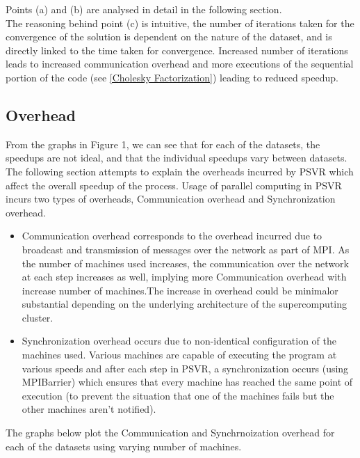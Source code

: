 \documentclass[12pt]{article}
\begin{document}
Points (a) and (b) are analysed in detail in the following section.\\
The reasoning behind point (c) is intuitive, the number of iterations taken for the convergence of the solution is dependent on the nature of the  dataset, and is directly linked to the time taken for convergence. Increased number of iterations leads to increased communication overhead and more executions of the sequential portion of the code (see \ref{Cholesky Factorization}) leading to reduced speedup.
\subsection{Overhead}
\label{Overhead}
From the graphs in Figure 1, we can see that for each of the datasets, the speedups are not ideal, and that the individual speedups vary between datasets.
The following section attempts to explain the overheads incurred by PSVR which affect the overall speedup of the process.
\newline\newline
Usage of parallel computing in PSVR incurs two types of overheads, Communication overhead and Synchronization overhead.
\begin{itemize}
\item Communication overhead corresponds to the overhead incurred due to broadcast and transmission of messages over the network as part of MPI. 
\newline
As the number of machines used increases, the communication over the network at each step increases as well, implying more Communication overhead with increase number of machines.The increase in overhead could be minimal\footnotemark or substantial depending on the underlying architecture of the supercomputing cluster.
\item Synchronization overhead occurs due to non-identical configuration of the machines used. Various machines are capable of executing the program at various speeds and after each step in PSVR, a synchronization occurs (using MPIBarrier) which ensures that every machine has reached the same point of execution (to prevent the situation that one of the machines fails but the other machines aren't notified).
\end{itemize}
The graphs below plot the Communication and Synchrnoization overhead for each of the datasets using varying number of machines.
\end{document}
